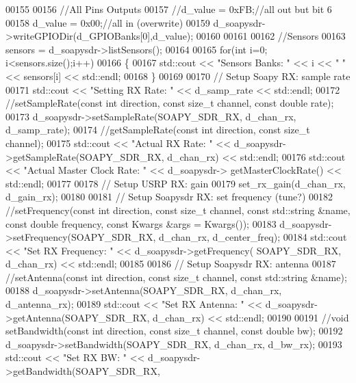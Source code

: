 \begin{DoxyCode}
00155 
00156       \textcolor{comment}{//All Pins Outputs}
00157       \textcolor{comment}{//d\_value = 0xFB;//all out but bit 6}
00158       d_value = 0x00;\textcolor{comment}{//all in (overwrite)}
00159       d_soapysdr->writeGPIODir(d_GPIOBanks[0],d_value);
00160 
00161 
00162       \textcolor{comment}{//Sensors}
00163       sensors = d_soapysdr->listSensors();
00164 
00165       \textcolor{keywordflow}{for}(\textcolor{keywordtype}{int} i=0; i<sensors.size();i++)
00166       \{
00167         std::cout << \textcolor{stringliteral}{"Sensors Banks: "} << i << \textcolor{stringliteral}{" "} << sensors[i] << std::endl;
00168       \}
00169 
00170       \textcolor{comment}{// Setup Soapy RX: sample rate}
00171       std::cout << \textcolor{stringliteral}{"Setting RX Rate: "} << d_samp_rate << std::endl;
00172       \textcolor{comment}{//setSampleRate(const int direction, const size\_t channel, const double rate);}
00173       d_soapysdr->setSampleRate(SOAPY_SDR_RX, d_chan_rx, d_samp_rate);
00174       \textcolor{comment}{//getSampleRate(const int direction, const size\_t channel);}
00175       std::cout << \textcolor{stringliteral}{"Actual RX Rate: "} << d_soapysdr->getSampleRate(SOAPY_SDR_RX, 
      d_chan_rx) << std::endl;
00176       std::cout << \textcolor{stringliteral}{"Actual Master Clock Rate: "} << d_soapysdr->
      getMasterClockRate() << std::endl;
00177 
00178       \textcolor{comment}{// Setup USRP RX: gain}
00179       set_rx_gain(d_chan_rx, d_gain_rx);
00180 
00181       \textcolor{comment}{// Setup Soapysdr RX: set frequency (tune?)}
00182       \textcolor{comment}{//setFrequency(const int direction, const size\_t channel, const std::string &name, const double
       frequency, const Kwargs &args = Kwargs());}
00183       d_soapysdr->setFrequency(SOAPY_SDR_RX, d_chan_rx, d_center_freq);
00184       std::cout << \textcolor{stringliteral}{"Set RX Frequency: "}  << d_soapysdr->getFrequency(
      SOAPY_SDR_RX, d_chan_rx) << std::endl;
00185 
00186       \textcolor{comment}{// Setup Soapysdr RX: antenna}
00187       \textcolor{comment}{//setAntenna(const int direction, const size\_t channel, const std::string &name);}
00188       d_soapysdr->setAntenna(SOAPY_SDR_RX, d_chan_rx, d_antenna_rx);
00189       std::cout << \textcolor{stringliteral}{"Set RX Antenna: "}  << d_soapysdr->getAntenna(SOAPY_SDR_RX, 
      d_chan_rx) << std::endl;
00190 
00191       \textcolor{comment}{//void setBandwidth(const int direction, const size\_t channel, const double bw);}
00192       d_soapysdr->setBandwidth(SOAPY_SDR_RX, d_chan_rx, d_bw_rx);
00193       std::cout << \textcolor{stringliteral}{"Set RX BW: "}  << d_soapysdr->getBandwidth(SOAPY_SDR_RX, 

\end{DoxyCode}
